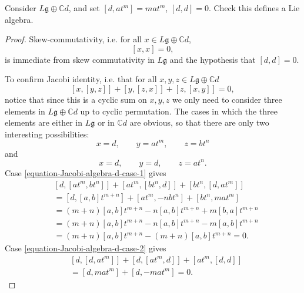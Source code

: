 \begin{exercise}
\label{exercise-Lie-algebra-d}
Consider $L\mathfrak{g}\oplus\mathbb{C}d$,
and set
$[d,at^m]=mat^m$, $[d,d]=0$. Check this
defines a Lie algebra.
\end{exercise}

\begin{proof}
Skew-commutativity, i.e. for all $x \in
L\mathfrak{g}\oplus\mathbb{C}d$,
\begin{equation}
\label{equation-skew-commutativity}
[x,x]=0,
\end{equation}
is immediate from
skew commutativity in $L\mathfrak{g}$ and
the hypothesis that $[d,d]=0$.

To confirm Jacobi identity, i.e. that for all
$x,y,z \in L\mathfrak{g}\oplus\mathbb{C}d$
\begin{equation}
\label{equation-Jacobi-algebra-d-identity}
[x,[y,z]]+[y,[z,x]]+[z,[x,y]]=0,
\end{equation}
notice that since this is a cyclic sum on
$x,y,z$
we only need to consider three elements in
$L\mathfrak{g} \oplus \mathbb{C}d$ up to
cyclic permutation.
The cases in which the three elements are
either in $L\mathfrak{g}$ or in
$\mathbb{C}d$ are obvious, so that there
are only two interesting possibilities:
\begin{equation}
\label{equation-Jacobi-algebra-d-case-1}
x=d,\qquad y=at^m,\qquad z=bt^n
\end{equation}
and
\begin{equation}
\label{equation-Jacobi-algebra-d-case-2}
x=d,\qquad y=d,\qquad z=at^n.
\end{equation}
Case \ref{equation-Jacobi-algebra-d-case-1}
gives
$$
\begin{aligned}
&
[d,[at^m,bt^n]]+[at^m,[bt^n,d]]+[bt^n,[d,
at^m]]\\
&=[d,[a,b]t^{m+n}]+[at^m,-nbt^n]+[bt^n,mat^m]
\\
&=(m+n)[a,b]t^{m+n}-n[a,b]t^{m+n}+m[b,a]t^{m+
n}\\
&=(m+n)[a,b]t^{m+n}-n[a,b]t^{m+n}-m[a,b]t^{m+
n}\\
&=(m+n)[a,b]t^{m+n}-(m+n)[a,b]t^{m+n}=0.
\end{aligned}
$$
Case \ref{equation-Jacobi-algebra-d-case-2}
gives
$$
\begin{aligned}
&[d,[d,at^m]]+[d,[at^m,d]]+[at^m,[d,d]]\\
&=[d,mat^m]+[d,-mat^m]=0.
\end{aligned}
$$

\end{proof}

